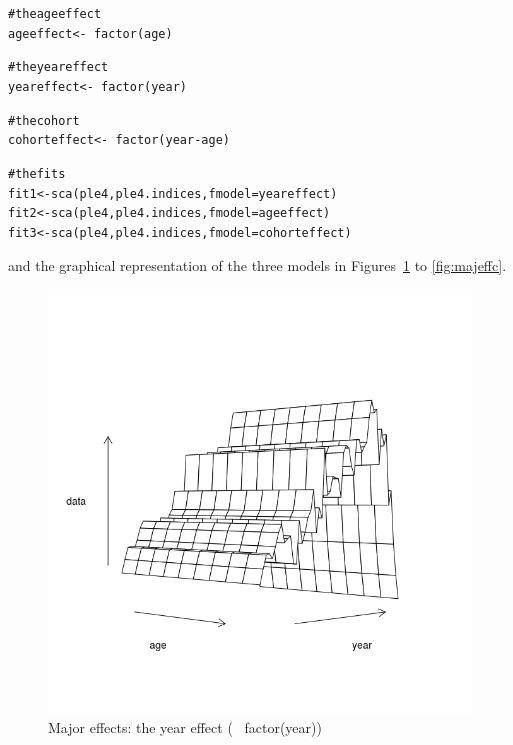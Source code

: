 \documentclass[a4paper,english,10pt]{article}\usepackage[]{graphicx}\usepackage[]{color}
\makeatletter
\newcommand{\hlcom}[1]{\textcolor[rgb]{0.588,0.588,0.588}{#1}}%
\newcommand{\hlopt}[1]{\textcolor[rgb]{0.196,0.196,0.196}{#1}}%
\newcommand{\hlstd}[1]{\textcolor[rgb]{0.196,0.196,0.196}{#1}}%
\newcommand{\hlkwb}[1]{\textcolor[rgb]{0.627,0,0.314}{#1}}%
\newcommand{\hlkwc}[1]{\textcolor[rgb]{0,0.631,0.314}{#1}}%
\newcommand{\hlkwd}[1]{\textcolor[rgb]{0.78,0.227,0.412}{#1}}%
\newenvironment{kframe}{%
 \def\at@end@of@kframe{}%
 \ifinner\ifhmode%
  \def\at@end@of@kframe{\end{minipage}}%
  \begin{minipage}{\columnwidth}%
 \fi\fi%
 \def\FrameCommand##1{\hskip\@totalleftmargin \hskip-\fboxsep
 \colorbox{shadecolor}{##1}\hskip-\fboxsep
     \hskip-\linewidth \hskip-\@totalleftmargin \hskip\columnwidth}%
 \MakeFramed {\advance\hsize-\width
   \@totalleftmargin\z@ \linewidth\hsize
   \@setminipage}}%
 {\par\unskip\endMakeFramed%
 \at@end@of@kframe}
\newenvironment{knitrout}{}{} %
\makeatother
\begin{document}
\begin{knitrout}
\color{fgcolor}\begin{kframe}
\begin{alltt}
\hlcom{# the age effect}
\hlstd{ageeffect} \hlkwb{<-} \hlopt{~}\hlkwd{factor}\hlstd{(age)}

\hlcom{# the year effect}
\hlstd{yeareffect} \hlkwb{<-} \hlopt{~}\hlkwd{factor}\hlstd{(year)}

\hlcom{# the cohort}
\hlstd{cohorteffect} \hlkwb{<-} \hlopt{~}\hlkwd{factor}\hlstd{(year} \hlopt{-} \hlstd{age)}

\hlcom{# the fits}
\hlstd{fit1} \hlkwb{<-} \hlkwd{sca}\hlstd{(ple4, ple4.indices,} \hlkwc{fmodel} \hlstd{= yeareffect)}
\hlstd{fit2} \hlkwb{<-} \hlkwd{sca}\hlstd{(ple4, ple4.indices,} \hlkwc{fmodel} \hlstd{= ageeffect)}
\hlstd{fit3} \hlkwb{<-} \hlkwd{sca}\hlstd{(ple4, ple4.indices,} \hlkwc{fmodel} \hlstd{= cohorteffect)}
\end{alltt}
\end{kframe}
\end{knitrout}

and the graphical representation of the three models in Figures~\ref{fig:majeffy} to \ref{fig:majeffc}.

\begin{knitrout}
\color{fgcolor}\begin{figure}[H]

{\centering \includegraphics[width=.9\linewidth]{figure/majeffy-1} 

}

\caption[Major effects]{Major effects: the year effect (~ factor(year))}\label{fig:majeffy}
\end{figure}


\end{knitrout}
\end{document}
